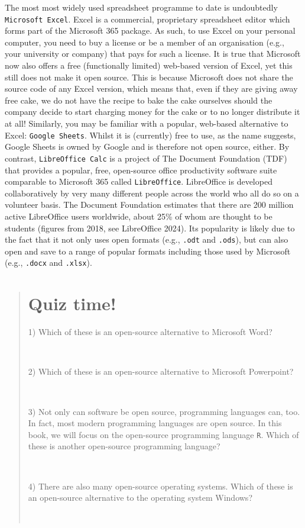 \documentclass[
  letterpaper,
  DIV=11,
  numbers=noendperiod]{scrreprt}
\begin{document}
The most most widely used spreadsheet programme to date is undoubtedly
\texttt{Microsoft\ Excel}. Excel is a commercial, proprietary
spreadsheet editor which forms part of the Microsoft 365 package. As
such, to use Excel on your personal computer, you need to buy a license
or be a member of an organisation (e.g., your university or company)
that pays for such a license. It is true that Microsoft now also offers
a free (functionally limited) web-based version of Excel, yet this still
does not make it open source. This is because Microsoft does not share
the source code of any Excel version, which means that, even if they are
giving away free cake, we do not have the recipe to bake the cake
ourselves should the company decide to start charging money for the cake
or to no longer distribute it at all! Similarly, you may be familiar
with a popular, web-based alternative to Excel: \texttt{Google\ Sheets}.
Whilst it is (currently) free to use, as the name suggests, Google
Sheets is owned by Google and is therefore not open source, either. By
contrast, \texttt{LibreOffice\ Calc} is a project of The Document
Foundation (TDF) that provides a popular, free, open-source office
productivity software suite comparable to Microsoft 365 called
\texttt{LibreOffice}. LibreOffice is developed collaboratively by very
many different people across the world who all do so on a volunteer
basis. The Document Foundation estimates that there are 200 million
active LibreOffice users worldwide, about 25\% of whom are thought to be
students (figures from 2018, see LibreOffice 2024). Its popularity is
likely due to the fact that it not only uses open formats (e.g.,
\texttt{.odt} and \texttt{.ods}), but can also open and save to a range
of popular formats including those used by Microsoft (e.g.,
\texttt{.docx} and \texttt{.xlsx}).

\begin{quote}
\section*{Quiz time!}\label{quiz-time}


1) Which of these is an open-source alternative to Microsoft Word?

~

2) Which of these is an open-source alternative to Microsoft Powerpoint?

~

3) Not only can software be open source, programming languages can, too.
In fact, most modern programming languages are open source. In this
book, we will focus on the open-source programming language \texttt{R}.
Which of these is another open-source programming language?

~

4) There are also many open-source operating systems. Which of these is
an open-source alternative to the operating system Windows?

~
\end{quote}
\end{document}
